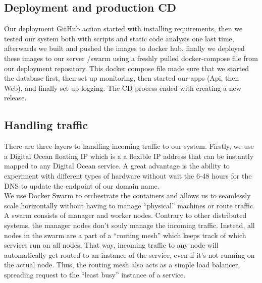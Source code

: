 \documentclass[12pt]{article}
\begin{document}
\subsection{Deployment and production CD}
Our deployment GitHub action started with installing requirements, then we tested our system both with scripts and static code analysis one last time, afterwards we built and pushed the images to docker hub, finally we deployed these images to our server /swarm using a freshly pulled docker-compose file from our deployment repository. This docker compose file made sure that we started the database first, then set up monitoring, then started our apps (Api, then Web), and finally set up logging. The CD process ended with creating a new release.
\\

\subsection{Handling traffic}
There are three layers to handling incoming traffic to our system. 
Firstly, we use a Digital Ocean floating IP which is a a flexible IP address that can be instantly mapped to any Digital Ocean service. A great advantage is the ability to experiment with different types of hardware without wait the 6-48 hours for the DNS to update the endpoint of our domain name. 
\ \\

\noindent
We use Docker Swarm to orchestrate the containers and allows us to seamlessly scale horizontally without having to manage “physical” machines or route traffic. A swarm consists of manager and worker nodes. Contrary to other distributed systems, the manager nodes don’t souly manage the incoming traffic. Instead, all nodes in the swarm are a part of a “routing mesh” which keeps track of which services run on all nodes. That way, incoming traffic to any node will automatically get routed to an instance of the service, even if it’s not running on the actual node. Thus, the routing mesh also acts as a simple load balancer, spreading request to the “least busy” instance of a service.
\end{document}

